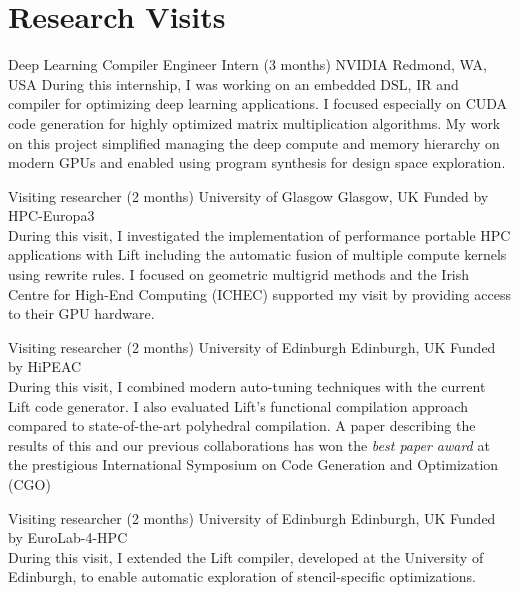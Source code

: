 \documentclass[11pt,a4paper,sans]{moderncv}        %
\begin{document}
\section{Research Visits}
					{Deep Learning Compiler Engineer Intern (3 months)}
					{NVIDIA}
					{Redmond, WA, USA}{}
					{
                    During this internship, I was working on an embedded DSL, IR and compiler for optimizing deep learning applications.
                    I focused especially on CUDA code generation for highly optimized matrix multiplication algorithms.
                    My work on this project simplified managing the deep compute and memory hierarchy on modern GPUs and enabled using program synthesis for design space exploration.
                    }

					{Visiting researcher (2 months)}
					{University of Glasgow}
					{Glasgow, UK}{}
					{Funded by HPC-Europa3\\
                     During this visit, I investigated the implementation of performance portable HPC applications with Lift including the automatic fusion of multiple compute kernels using rewrite rules.
                     I focused on geometric multigrid methods and the Irish Centre for High-End Computing (ICHEC) supported my visit by providing access to their GPU hardware.
					}

					{Visiting researcher (2 months)}
					{University of Edinburgh}
					{Edinburgh, UK}{}
					{Funded by HiPEAC\\
                     During this visit, I combined modern auto-tuning techniques with the current Lift code generator.
                     I also evaluated Lift's functional compilation approach compared to state-of-the-art polyhedral compilation.
                     A paper describing the results of this and our previous collaborations has won the \textit{best paper award} at the prestigious International Symposium on Code Generation and Optimization (CGO)~\cite{cgo2018}
					}

					{Visiting researcher (2 months)}
					{University of Edinburgh}
					{Edinburgh, UK}{}
					{Funded by EuroLab-4-HPC\\
					 During this visit, I extended the Lift compiler, developed at the
					 University of Edinburgh, to enable automatic exploration of stencil-specific optimizations.
					}
\end{document}
